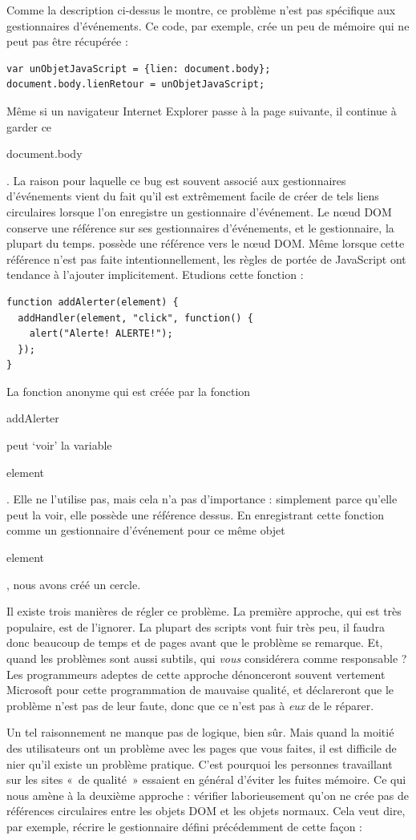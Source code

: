 \documentclass{FramateX}
\renewcommand{\texttt}[1]{\begin{sffamily}{#1}\end{sffamily}}
\begin{document}
Comme la description ci-dessus le montre, ce problème n'est pas
spécifique aux gestionnaires d'événements. Ce code, par exemple, crée un
peu de mémoire qui ne peut pas être récupérée :

\begin{lstlisting}
var unObjetJavaScript = {lien: document.body};
document.body.lienRetour = unObjetJavaScript;
\end{lstlisting}
Même si un navigateur Internet Explorer passe à la page suivante, il
continue à garder ce \texttt{document.body}. La raison pour laquelle ce
bug est souvent associé aux gestionnaires d'événements vient du fait
qu'il est extrêmement facile de créer de tels liens circulaires lorsque
l'on enregistre un gestionnaire d'événement. Le nœud DOM conserve une
référence sur ses gestionnaires d'événements, et le gestionnaire, la
plupart du temps. possède une référence vers le nœud DOM. Même lorsque
cette référence n'est pas faite intentionnellement, les règles de portée
de JavaScript ont tendance à l'ajouter implicitement. Etudions cette
fonction :

\begin{lstlisting}
function addAlerter(element) {
  addHandler(element, "click", function() {
    alert("Alerte! ALERTE!");
  });
}
\end{lstlisting}
La fonction anonyme qui est créée par la fonction \texttt{addAlerter}
peut `voir' la variable \texttt{element}. Elle ne l'utilise pas, mais
cela n'a pas d'importance : simplement parce qu'elle peut la voir, elle
possède une référence dessus. En enregistrant cette fonction comme un
gestionnaire d'événement pour ce même objet \texttt{element}, nous avons
créé un cercle.

Il existe trois manières de régler ce problème. La première approche,
qui est très populaire, est de l'ignorer. La plupart des scripts vont
fuir très peu, il faudra donc beaucoup de temps et de pages avant que le
problème se remarque. Et, quand les problèmes sont aussi subtils, qui
\emph{vous} considérera comme responsable ? Les programmeurs adeptes de
cette approche dénonceront souvent vertement Microsoft pour cette
programmation de mauvaise qualité, et déclareront que le problème n'est
pas de leur faute, donc que ce n'est pas à \emph{eux} de le réparer.

Un tel raisonnement ne manque pas de logique, bien sûr. Mais quand la
moitié des utilisateurs ont un problème avec les pages que vous faites,
il est difficile de nier qu'il existe un problème pratique. C'est
pourquoi les personnes travaillant sur les sites «~de qualité~» essaient
en général d'éviter les fuites mémoire. Ce qui nous amène à la deuxième
approche : vérifier laborieusement qu'on ne crée pas de références
circulaires entre les objets DOM et les objets normaux. Cela veut dire,
par exemple, récrire le gestionnaire défini précédemment de cette façon
:
\end{document}
